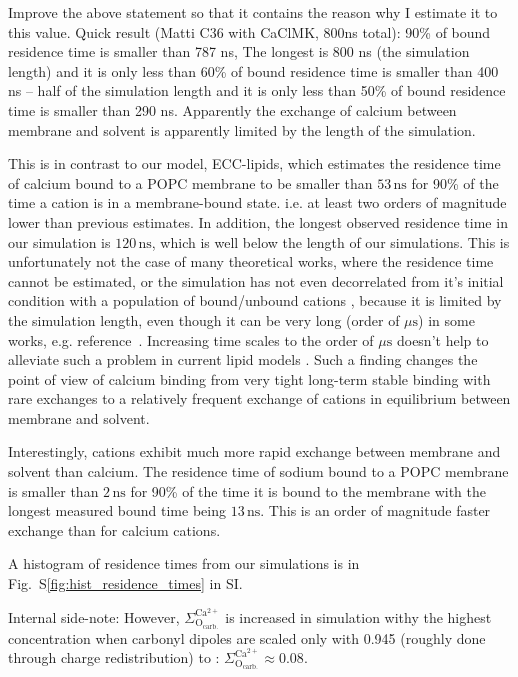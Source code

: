 \documentclass[aip,jcp,twocolumn]{revtex4}
\begin{document}
Improve the above statement so that it contains the reason why I estimate it to this value.
Quick result (Matti C36 with CaClMK, 800ns total):
90\% of bound residence time is smaller than 787 ns, 
The longest is 800 ns (the simulation length)
and it is only less than
60\% of bound residence time is smaller than 400 ns -- half of the simulation length 
and it is only less than
50\% of bound residence time is smaller than 290 ns.
Apparently the exchange of calcium between membrane and solvent 
is apparently limited by the length of the simulation. 


This is in contrast to our model, ECC-lipids, 
which estimates the residence time of calcium bound to a POPC membrane to be 
smaller than $53\,\mathrm{ns}$ for 90\% of the time a cation is in a membrane-bound state. 
i.e. at least two orders of magnitude lower than previous estimates.
In addition, the longest observed residence time in our simulation is $120\,\mathrm{ns}$, 
which is well below the length of our simulations.
This is unfortunately not the case of many theoretical works,
where the residence time cannot be estimated,
or the simulation has not even decorrelated from it's 
initial condition with a population of bound/unbound cations \cite{catte16}, 
because it is limited by the simulation length, 
even though it can be very long (order of $\mu\mathrm{s}$) in some works, e.g. reference~. 
Increasing time scales to the order of $\mu\mathrm{s}$ 
doesn't help to alleviate such a problem in current lipid models \cite{javanainen17}. %
Such a finding changes the point of view of calcium binding from
very tight long-term stable binding with rare exchanges to 
a relatively frequent exchange of cations 
in equilibrium between membrane and solvent. 

Interestingly,  cations exhibit much more rapid exchange between membrane and solvent than calcium.
The residence time of sodium bound to a POPC membrane is
smaller than $2\,\mathrm{ns}$ for 90\% of the time it is bound to the membrane 
with the longest measured bound time being $13\,\mathrm{ns}$. 
This is an order of magnitude faster exchange than for calcium cations. 

A histogram of residence times from our simulations is in Fig.~S\ref{fig:hist_residence_times} in SI. 

Internal side-note: 
However, $\Sigma ^\mathrm{Ca^{2+}} _\mathrm{O_{carb.}}$ is increased 
in simulation withy the highest  concentration
when carbonyl dipoles are scaled only with 0.945 
(roughly done through charge redistribution)
 to : $\Sigma ^\mathrm{Ca^{2+}} _\mathrm{O_{carb.}} \approx 0.08 $.    %
\end{document}
